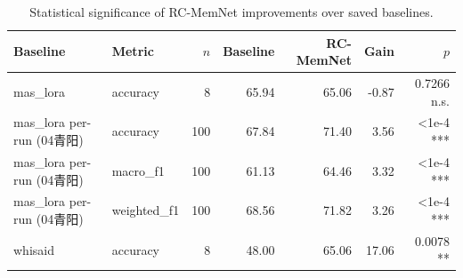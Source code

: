 \begin{table}[!t]
\centering
\caption{Statistical significance of RC-MemNet improvements over saved baselines.}
\label{tab:statistical_significance}
\scriptsize
\begin{tabular}{llrrrrr}
\toprule
Baseline & Metric & $n$ & Baseline & RC-MemNet & Gain & $p$ \\
\midrule
mas_lora & accuracy & 8 & 65.94 & 65.06 & -0.87 & 0.7266 n.s. \\
mas_lora per-run (04青阳) & accuracy & 100 & 67.84 & 71.40 & 3.56 & <1e-4 *** \\
mas_lora per-run (04青阳) & macro_f1 & 100 & 61.13 & 64.46 & 3.32 & <1e-4 *** \\
mas_lora per-run (04青阳) & weighted_f1 & 100 & 68.56 & 71.82 & 3.26 & <1e-4 *** \\
whisaid & accuracy & 8 & 48.00 & 65.06 & 17.06 & 0.0078 ** \\
\bottomrule
\end{tabular}
\end{table}
